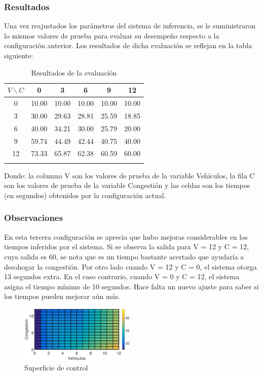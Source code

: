\pagebreak
\subsubsection{Resultados}
Una vez reajustados los parámetros del sistema de inferencia, se le suministraron lo mismos valores de prueba para evaluar su desempeño respecto a la configuración anterior. Los resultados de dicha evaluación se reflejan en la tabla siguiente:

\begin{longtable}[c]{cccccc} \toprule
	$V \backslash C$ &  0 & 3 & 6 & 9 & 12 \\ \midrule
	0 & 10.00 & 10.00 & 10.00 & 10.00 & 10.00 \\
	3 & 30.00 & 29.63 & 28.81 & 25.59 & 18.85 \\
	6 & 40.00 & 34.21 & 30.00 & 25.79 & 20.00 \\
	9 & 59.74 & 44.49 & 42.44 & 40.75 & 40.00 \\
	12& 73.33 & 65.87 & 62.38 & 60.59 & 60.00 \\
	\caption[Resultados de la evaluación (configuración \textit{C})]{Resultados de la evaluación}
\end{longtable}

Donde: la columna V son los valores de prueba de la variable Vehículos, la fila C son los valores de  prueba de la variable Congestión y las celdas son los tiempos (en segundos) obtenidos por la configuración actual.

\subsubsection{Observaciones}
\begin{multicols}{2}

	En esta tercera configuración se aprecia que hubo mejoras considerables en los tiempos inferidos por el sistema. Si se observa la salida para V = 12 y C = 12, cuya salida es 60, se nota que es un tiempo bastante acertado que ayudaría a desahogar la congestión. Por otro lado cuando V = 12 y C = 0, el sistema otorga 13 segundos extra. En el caso contrario, cuando V = 0 y C = 12, el sistema asigna el tiempo mínimo de 10 segundos. Hace falta un nuevo ajuste para saber si los tiempos pueden mejorar aún más.
	
	\begin{figure}[H]
		\includegraphics[width=0.49\textwidth]{Surfaces/Surface2D_C.eps}
		\caption[Superficie de control (configuración \textit{C})]{Superficie de control}
	\end{figure}
\end{multicols}
\pagebreak





